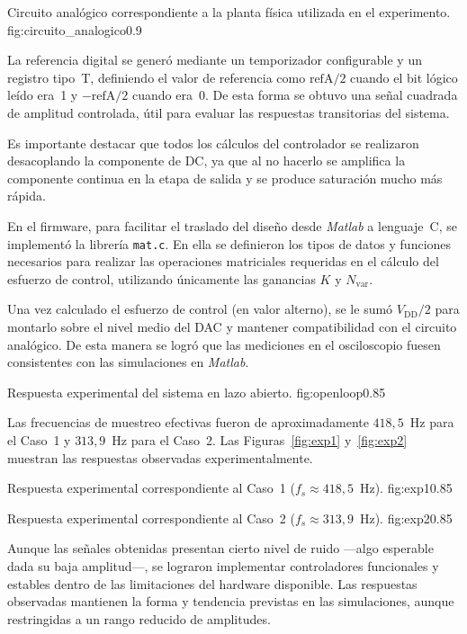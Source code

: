 {Circuito analógico correspondiente a la planta física utilizada en el experimento.}
{fig:circuito_analogico}{0.9}

La referencia digital se generó mediante un temporizador configurable 
y un registro tipo~T, definiendo el valor de referencia como $\mathrm{refA}/2$ 
cuando el bit lógico leído era~1 y $-\mathrm{refA}/2$ cuando era~0. 
De esta forma se obtuvo una señal cuadrada de amplitud controlada, 
útil para evaluar las respuestas transitorias del sistema.

Es importante destacar que todos los cálculos del controlador se realizaron 
desacoplando la componente de \textsc{DC}, 
ya que al no hacerlo se amplifica la componente continua en la etapa de salida 
y se produce saturación mucho más rápida.

En el firmware, para facilitar el traslado del diseño desde \textit{Matlab} a lenguaje~C, 
se implementó la librería \texttt{mat.c}. 
En ella se definieron los tipos de datos y funciones necesarios para realizar las operaciones matriciales requeridas en el cálculo del esfuerzo de control, 
utilizando únicamente las ganancias $K$ y $N_{\mathrm{var}}$.

Una vez calculado el esfuerzo de control (en valor alterno), 
se le sumó $V_{\mathrm{DD}}/2$ para montarlo sobre el nivel medio del DAC 
y mantener compatibilidad con el circuito analógico. 
De esta manera se logró que las mediciones en el osciloscopio 
fuesen consistentes con las simulaciones en \textit{Matlab}.

{Respuesta experimental del sistema en lazo abierto.}
{fig:openloop}{0.85}

Las frecuencias de muestreo efectivas fueron de aproximadamente 
$418{,}5$~Hz para el Caso~1 y $313{,}9$~Hz para el Caso~2. 
Las Figuras~\ref{fig:exp1} y~\ref{fig:exp2} muestran las respuestas observadas experimentalmente.

{Respuesta experimental correspondiente al Caso~1 ($f_s \approx 418{,}5$~Hz).}
{fig:exp1}{0.85}

{Respuesta experimental correspondiente al Caso~2 ($f_s \approx 313{,}9$~Hz).}
{fig:exp2}{0.85}

Aunque las señales obtenidas presentan cierto nivel de ruido —algo esperable dada su baja amplitud—, 
se lograron implementar controladores funcionales y estables dentro de las limitaciones del hardware disponible. 
Las respuestas observadas mantienen la forma y tendencia previstas en las simulaciones, 
aunque restringidas a un rango reducido de amplitudes.

